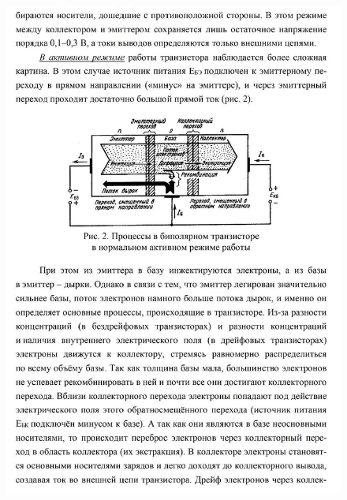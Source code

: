 \documentclass[a4paper,14pt]{article}
\begin{document}
\begin{figure}[H]
	\centering
	\includegraphics[width=\linewidth]{images/theory_2}
	\caption*{}
	\label{fig:theory2}
\end{figure}
\end{document}
